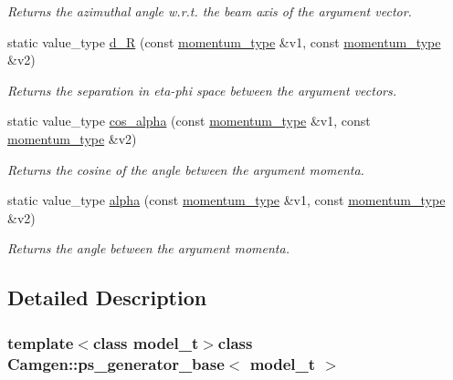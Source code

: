 \begin{DoxyCompactItemize}
\begin{DoxyCompactList}\small\item\em Returns the azimuthal angle w.\-r.\-t. the beam axis of the argument vector. \end{DoxyCompactList}\item 
\hypertarget{a00442_aa01f45e3c5cbd9e10a7e182310a00dd1}{static value\-\_\-type \hyperlink{a00442_aa01f45e3c5cbd9e10a7e182310a00dd1}{d\-\_\-\-R} (const \hyperlink{a00559}{momentum\-\_\-type} \&v1, const \hyperlink{a00559}{momentum\-\_\-type} \&v2)}\label{a00442_aa01f45e3c5cbd9e10a7e182310a00dd1}

\begin{DoxyCompactList}\small\item\em Returns the separation in eta-\/phi space between the argument vectors. \end{DoxyCompactList}\item 
\hypertarget{a00442_a9a0a8bff777a6427543d5a2d27c297c6}{static value\-\_\-type \hyperlink{a00442_a9a0a8bff777a6427543d5a2d27c297c6}{cos\-\_\-alpha} (const \hyperlink{a00559}{momentum\-\_\-type} \&v1, const \hyperlink{a00559}{momentum\-\_\-type} \&v2)}\label{a00442_a9a0a8bff777a6427543d5a2d27c297c6}

\begin{DoxyCompactList}\small\item\em Returns the cosine of the angle between the argument momenta. \end{DoxyCompactList}\item 
\hypertarget{a00442_ad2e9ce507c31c79eaec49202c3bacfd8}{static value\-\_\-type \hyperlink{a00442_ad2e9ce507c31c79eaec49202c3bacfd8}{alpha} (const \hyperlink{a00559}{momentum\-\_\-type} \&v1, const \hyperlink{a00559}{momentum\-\_\-type} \&v2)}\label{a00442_ad2e9ce507c31c79eaec49202c3bacfd8}

\begin{DoxyCompactList}\small\item\em Returns the angle between the argument momenta. \end{DoxyCompactList}\end{DoxyCompactItemize}


\subsection{Detailed Description}
\subsubsection*{template$<$class model\-\_\-t$>$class Camgen\-::ps\-\_\-generator\-\_\-base$<$ model\-\_\-t $>$}

